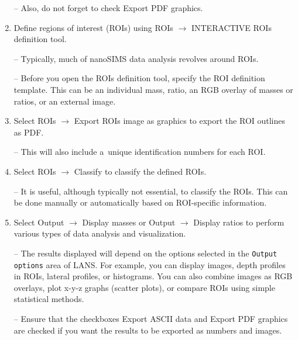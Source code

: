 \documentclass[a4paper, 11pt]{article}
\newcommand{\ttt}[1]{\texttt{#1}}
\newcommand{\lans}[1]{{\color{magenta}#1}}
\newcommand{\lanscb}[1]{{\color{darkgreen}#1}}
\newcommand{\lanstf}[1]{{\color{cyan}#1}}
\newcommand\ra{\rightarrow}
\newcommand\addon[1]{-- {\small #1}}
\begin{document}
\begin{enumerate}
\addon{Also, do not forget to check \lanscb{Export PDF graphics}.}

\item Define regions of interest (ROIs) using \lans{ROIs} $\ra$ \lans{INTERACTIVE ROIs definition tool}.

\addon{Typically, much of nanoSIMS data analysis revolves around ROIs.}

\addon{Before you open the ROIs definition tool, specify the \lanstf{ROI definition template}.  This can be an individual mass, ratio, an RGB overlay of masses or ratios, or an external image.}


\item Select \lans{ROIs} $\ra$ \lans{Export ROIs image as graphics} to export the ROI outlines as PDF. 

\addon{This will also include a~unique identification numbers for each ROI.}

\item Select \lans{ROIs} $\ra$ \lans{Classify} to classify the defined ROIs. 

\addon{It is useful, although typically not essential, to classify the ROIs. This can be done \lans{manually} or \lans{automatically} based on ROI-specific information.}

\item Select \lans{Output} $\ra$ \lans{Display masses} or \lans{Output} $\ra$ \lans{Display ratios} to perform various types of data analysis and visualization.

\addon{The results displayed will depend on the options selected in the \ttt{Output options} area of LANS. For example, you can display \lanscb{images}, \lanscb{depth profiles in ROIs}, \lanscb{lateral profiles}, or \lanscb{histograms}. You can also \lanscb{combine images as RGB} overlays, \lanscb{plot x-y-z graphs} (scatter plots), or \lanscb{compare ROIs} using simple statistical methods.}

\addon{Ensure that the checkboxes \lanscb{Export ASCII data} and \lanscb{Export PDF graphics} are checked if you want the results to be exported as numbers and images.}



\end{enumerate}
\end{document}
